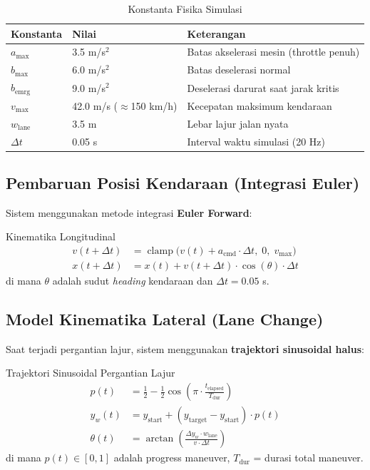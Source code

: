 \documentclass[12pt,a4paper]{article}
\begin{document}
\begin{table}[ht]
\centering
\caption{Konstanta Fisika Simulasi}
\begin{tabular}{lll}
\toprule
\textbf{Konstanta} & \textbf{Nilai} & \textbf{Keterangan} \\
\midrule
$a_{\max}$ & 3.5 m/s$^{2}$ & Batas akselerasi mesin (throttle penuh) \\
$b_{\max}$ & 6.0 m/s$^{2}$ & Batas deselerasi normal \\
$b_{\text{emrg}}$ & 9.0 m/s$^{2}$ & Deselerasi darurat saat jarak kritis \\
$v_{\max}$ & 42.0 m/s ($\approx$150 km/h) & Kecepatan maksimum kendaraan \\
$w_{\text{lane}}$ & 3.5 m & Lebar lajur jalan nyata \\
$\Delta t$ & 0.05 s & Interval waktu simulasi (20 Hz) \\
\bottomrule
\end{tabular}
\end{table}

\subsection{Pembaruan Posisi Kendaraan (Integrasi Euler)}

Sistem menggunakan metode integrasi \textbf{Euler Forward}:

\begin{formulabox}{Kinematika Longitudinal}
\begin{align}
  v(t{+}\Delta t) &= \operatorname{clamp}\!\bigl(v(t) + a_{\text{cmd}} \cdot \Delta t,\; 0,\; v_{\max}\bigr) \label{eq:v_update}\\[4pt]
  x(t{+}\Delta t) &= x(t) + v(t{+}\Delta t) \cdot \cos(\theta) \cdot \Delta t \label{eq:x_update}
\end{align}
di mana $\theta$ adalah sudut \textit{heading} kendaraan dan $\Delta t = 0.05$ s.
\end{formulabox}

\subsection{Model Kinematika Lateral (Lane Change)}

Saat terjadi pergantian lajur, sistem menggunakan \textbf{trajektori sinusoidal halus}:

\begin{formulabox}{Trajektori Sinusoidal Pergantian Lajur}
\begin{align}
  p(t) &= \tfrac{1}{2} - \tfrac{1}{2}\cos\!\!\left(\pi \cdot \frac{t_{\text{elapsed}}}{T_{\text{dur}}}\right) \label{eq:sinusoidal}\\[4pt]
  y_w(t) &= y_{\text{start}} + (y_{\text{target}} - y_{\text{start}}) \cdot p(t) \label{eq:lane_pos}\\[4pt]
  \theta(t) &= \arctan\!\!\left(\frac{\Delta y_w \cdot w_{\text{lane}}}{v \cdot \Delta t}\right) \label{eq:heading}
\end{align}
di mana $p(t) \in [0,1]$ adalah progress maneuver, $T_{\text{dur}}$ = durasi total maneuver.
\end{formulabox}
\end{document}
